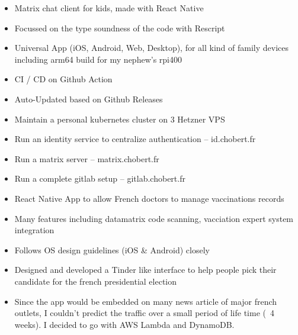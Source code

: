 \documentclass[10pt,a4paper,ragged2e,withhyper]{altacv}
\begin{document}
\begin{paracol}{2}

  \begin{itemize}
    \item Matrix chat client for kids, made with React Native
    \item Focussed on the type soundness of the code with Rescript
    \item Universal App (iOS, Android, Web, Desktop), for all kind of family devices including arm64 build for my nephew's rpi400
    \item CI / CD on Github Action
    \item Auto-Updated based on Github Releases
  \end{itemize}

  \newpage

  \begin{itemize}
    \item Maintain a personal kubernetes cluster on 3 Hetzner VPS
    \item Run an identity service to centralize authentication -- id.chobert.fr
    \item Run a matrix server -- matrix.chobert.fr
    \item Run a complete gitlab setup -- gitlab.chobert.fr
  \end{itemize}

  \divider

  \begin{itemize}
    \item React Native App to allow French doctors to manage vaccinations records
    \item Many features including datamatrix code scanning, vacciation expert system integration
    \item Follows OS design guidelines (iOS \& Android) closely
  \end{itemize}

  \divider

  \begin{itemize}
    \item Designed and developed a Tinder like interface to help people pick their candidate for the french presidential election
    \item Since the app would be embedded on many news article of major french outlets,
          I couldn't predict the traffic over a small period of life time (~4 weeks).
          I decided to go with AWS Lambda and DynamoDB.
  \end{itemize}


\end{paracol}
\end{document}
